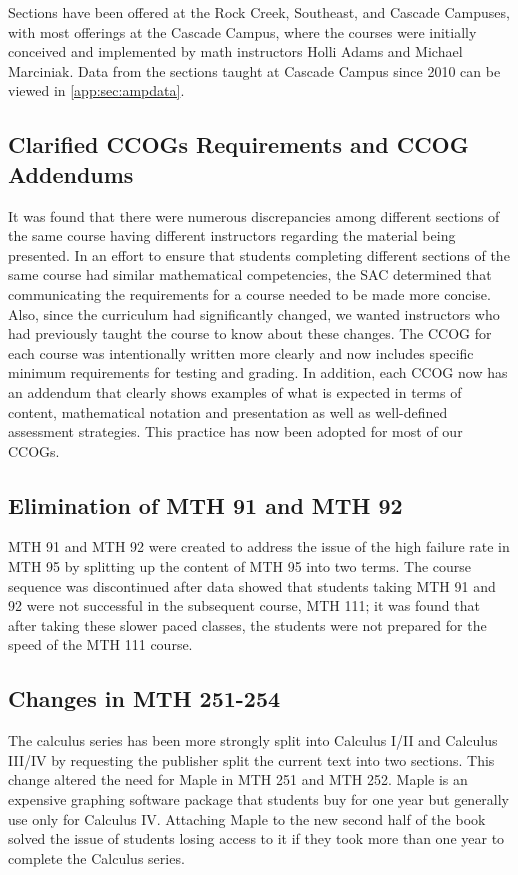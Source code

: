 Sections have been offered at the Rock Creek, Southeast, and Cascade Campuses,
with most offerings at the Cascade Campus, where the courses were initially conceived and implemented by math instructors Holli Adams and  Michael Marciniak. Data from the sections taught at
Cascade Campus since 2010 can be viewed in \vref{app:sec:ampdata}.
 
\subsection{Clarified CCOGs Requirements and CCOG Addendums}
It was found that there were numerous discrepancies among different sections of
the same course having different instructors regarding the material being
presented. In an effort to ensure that students completing different sections of
the same course had similar mathematical competencies, the SAC determined that
communicating the requirements for a course needed to be made more concise.
Also, since the curriculum had significantly changed, we wanted instructors who
had previously taught the course to know about these changes.  The CCOG for each
course was intentionally written more clearly and now includes specific minimum
requirements for testing and grading.  In addition, each CCOG now has an
addendum that clearly shows examples of what is expected in terms of content,
mathematical notation and presentation as well as well-defined assessment
strategies.  This practice has now been adopted for most of our CCOGs.
 
\subsection{Elimination of MTH 91 and MTH 92}
MTH 91 and MTH 92 were created to address the issue of the high failure rate in
MTH 95 by splitting up the content of MTH 95 into two terms.  The course
sequence was discontinued after data showed that students taking MTH 91 and 92
were not successful in the subsequent course, MTH 111; it was found that after
taking these slower paced classes, the students were not prepared for the speed
of the MTH 111 course.
 
\subsection{Changes in MTH 251-254}
The calculus series has been more strongly split into Calculus I/II and Calculus
III/IV by requesting the publisher split the current text into two sections.
This change altered the need for Maple in MTH 251 and MTH 252.  Maple is an
expensive graphing software package that students buy for one year but generally
use only for Calculus IV. Attaching Maple to the new second half of the book
solved the issue of students losing access to it if they took more than one year
to complete the Calculus series.

